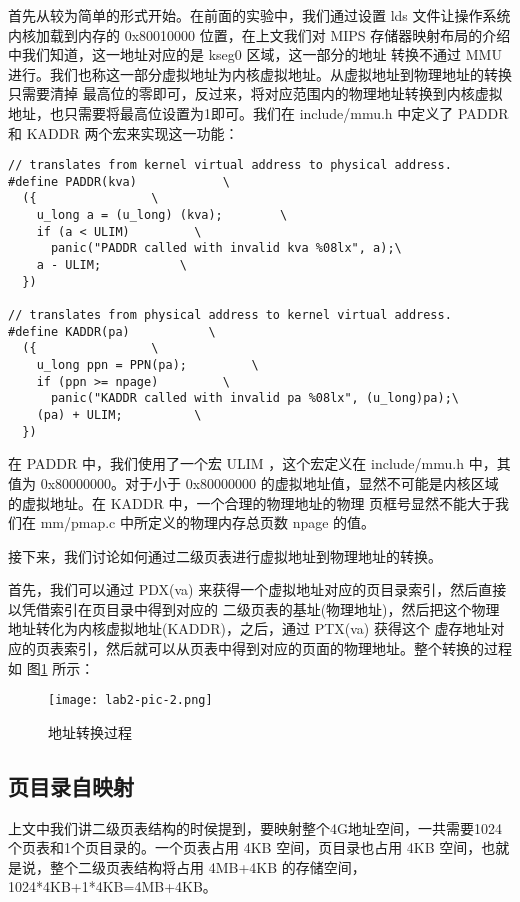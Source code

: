 首先从较为简单的形式开始。在前面的实验中，我们通过设置 lds 文件让操作系统内核加载到内存的 0x80010000
位置，在上文我们对 MIPS 存储器映射布局的介绍中我们知道，这一地址对应的是 kseg0 区域，这一部分的地址
转换不通过 MMU 进行。我们也称这一部分虚拟地址为内核虚拟地址。从虚拟地址到物理地址的转换只需要清掉
最高位的零即可，反过来，将对应范围内的物理地址转换到内核虚拟地址，也只需要将最高位设置为1即可。我们在
 include/mmu.h 中定义了 PADDR 和 KADDR 两个宏来实现这一功能：

\begin{verbatim}
// translates from kernel virtual address to physical address.
#define PADDR(kva)            \
  ({                \
    u_long a = (u_long) (kva);        \
    if (a < ULIM)         \
      panic("PADDR called with invalid kva %08lx", a);\
    a - ULIM;           \
  })

// translates from physical address to kernel virtual address.
#define KADDR(pa)           \
  ({                \
    u_long ppn = PPN(pa);         \
    if (ppn >= npage)         \
      panic("KADDR called with invalid pa %08lx", (u_long)pa);\
    (pa) + ULIM;          \
  })
\end{verbatim}

在 PADDR 中，我们使用了一个宏 ULIM ，这个宏定义在 include/mmu.h 中，其值为 0x80000000。对于小于
 0x80000000 的虚拟地址值，显然不可能是内核区域的虚拟地址。在 KADDR 中，一个合理的物理地址的物理
页框号显然不能大于我们在 mm/pmap.c 中所定义的物理内存总页数 npage 的值。

接下来，我们讨论如何通过二级页表进行虚拟地址到物理地址的转换。

首先，我们可以通过 PDX(va) 来获得一个虚拟地址对应的页目录索引，然后直接以凭借索引在页目录中得到对应的
二级页表的基址(物理地址)，然后把这个物理地址转化为内核虚拟地址(KADDR)，之后，通过 PTX(va) 获得这个
虚存地址对应的页表索引，然后就可以从页表中得到对应的页面的物理地址。整个转换的过程如 图\ref{lab2-pic-2.png}
所示：

\begin{figure}[htbp]
  \centering
  \texttt{[image: lab2-pic-2.png]}
  \caption{地址转换过程}\label{lab2-pic-2.png}
\end{figure}

\subsection{页目录自映射}

上文中我们讲二级页表结构的时侯提到，要映射整个4G地址空间，一共需要1024个页表和1个页目录的。一个页表占用 4KB
空间，页目录也占用 4KB 空间，也就是说，整个二级页表结构将占用 4MB+4KB 的存储空间，1024*4KB+1*4KB=4MB+4KB。

